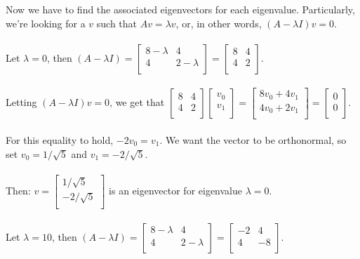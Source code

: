 \documentclass[11pt]{article}
\begin{document}
Now we have to find the associated eigenvectors for each eigenvalue. Particularly, we're looking for a $v$ such that $Av = \lambda v$, or, in other words, $(A - \lambda I)v = 0$. \\\\
Let $\lambda = 0$, then $(A - \lambda I) = \begin{bmatrix}
8 - \lambda & 4 \\
4 & 2 - \lambda \\
\end{bmatrix} = \begin{bmatrix}
8 & 4 \\
4 & 2 \\
\end{bmatrix}$. \\\\
Letting $(A - \lambda I)v = 0$, we get that $ \begin{bmatrix}
8 & 4 \\
4 & 2 \\
\end{bmatrix} \begin{bmatrix}
v_0 \\
v_1 \\
\end{bmatrix} = \begin{bmatrix}
8v_0 + 4v_1 \\
4v_0 + 2v_1 \\
\end{bmatrix} = \begin{bmatrix}
0 \\
0 \\
\end{bmatrix} $. \\\\
For this equality to hold, $-2v_0 = v_1$. We want the vector to be orthonormal, so set $v_0 = 1 / \sqrt5$ and $v_1 = - 2 / \sqrt5.$ \\\\
Then: $v = \begin{bmatrix}
1 / \sqrt5 \\
-2 / \sqrt5 \\
\end{bmatrix}$ is an eigenvector for eigenvalue $\lambda = 0$. \\\\
Let $\lambda = 10$, then $(A - \lambda I) = \begin{bmatrix}
8 - \lambda & 4 \\
4 & 2 - \lambda \\
\end{bmatrix} = \begin{bmatrix}
-2 & 4 \\
4 & -8 \\
\end{bmatrix}$. \\\\
\end{document}
